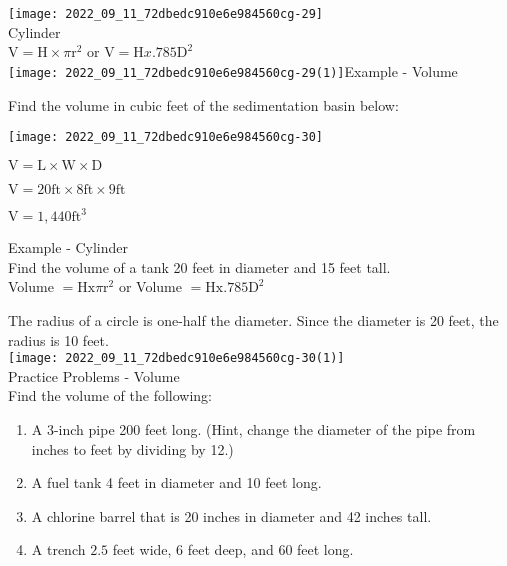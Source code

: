 \texttt{[image: 2022\_09\_11\_72dbedc910e6e984560cg-29]}\\

Cylinder\\

$\mathrm{V}=\mathrm{H} \times \pi \mathrm{r}^{2}$ or $\mathrm{V}=\mathrm{H} x .785 \mathrm{D}^{2}$\\

\texttt{[image: 2022\_09\_11\_72dbedc910e6e984560cg-29(1)]}Example - Volume

Find the volume in cubic feet of the sedimentation basin below:

\texttt{[image: 2022\_09\_11\_72dbedc910e6e984560cg-30]}

$\mathrm{V}=\mathrm{L} \times \mathrm{W} \times \mathrm{D}$

$\mathrm{V}=20 \mathrm{ft} \times 8 \mathrm{ft} \times 9 \mathrm{ft}$

$\mathrm{V}=1,440 \mathrm{ft}^{3}$

Example - Cylinder\\

Find the volume of a tank 20 feet in diameter and 15 feet tall.\\

Volume $=\mathrm{Hx} \pi \mathrm{r}^{2}$ or Volume $=\mathrm{H} \mathrm{x} .785 \mathrm{D}^{2}$

The radius of a circle is one-half the diameter. Since the diameter is 20 feet, the radius is 10 feet.\\

\texttt{[image: 2022\_09\_11\_72dbedc910e6e984560cg-30(1)]}\\

Practice Problems - Volume\\
Find the volume of the following:\\
\begin{enumerate}
\item A 3-inch pipe 200 feet long. (Hint, change the diameter of the pipe from inches to feet by dividing by 12.)\\
\item A fuel tank 4 feet in diameter and 10 feet long.\\
\item A chlorine barrel that is 20 inches in diameter and 42 inches tall.\\
\item A trench $2.5$ feet wide, 6 feet deep, and 60 feet long.
\end{enumerate}
